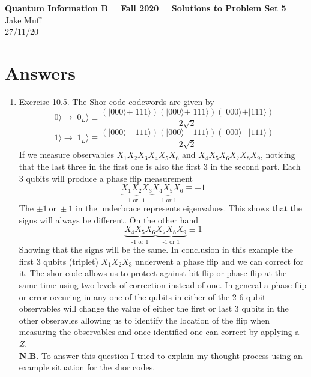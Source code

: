 \documentclass[12pt]{article}
\newcommand{\ket}[1]{\vert{#1}\rangle}
\begin{document}
\normalsize

\baselineskip 14pt

\begin{center}
{\Large {\bf Quantum Information B \ \ Fall 2020 \ \  Solutions to Problem Set 5}} \\
Jake Muff \\
27/11/20
\end{center}

\bigskip
\section{Answers}

\begin{enumerate}
    \item Exercise 10.5. The Shor code codewords are given by 
    $$ \ket{0} \rightarrow \ket{0_L} \equiv \frac{(\ket{000} + \ket{111}) (\ket{000}+\ket{111} )( \ket{000} +\ket{111} )}{2 \sqrt{2} } $$
    $$ \ket{1} \rightarrow \ket{1_L} \equiv \frac{(\ket{000} - \ket{111}) (\ket{000}- \ket{111} )( \ket{000} - \ket{111} )}{2 \sqrt{2} } $$
    If we measure observables $X_1 X_2 X_3 X_4 X_5 X_6$ and $X_4 X_5 X_6 X_7 X_8 X_9$, noticing that the last three in the first one is also the first 3 in the second part. Each 3 qubits will produce a phase flip measurement 
    $$ \underbrace{X_1 X_2 X_3 }_{\text{1 or -1}} \underbrace{X_4 X_5 X_6 }_{\text{-1 or 1}} \equiv -1 $$
    The $\pm 1 \ \text{or}\ \pm 1$ in the underbrace represents eigenvalues. This shows that the signs will always be different. On the other hand 
    $$ \underbrace{X_4 X_5 X_6 }_{\text{-1 or 1}} \underbrace{X_7 X_8 X_9 }_{\text{-1 or 1}} \equiv 1 $$
    Showing that the signs will be the same. In conclusion in this example the first 3 qubits (triplet) $X_1 X_2 X_3$ underwent a phase flip and we can correct for it. The shor code allows us to protect against bit flip or phase flip at the same time using two levels of correction instead of one. 
    In general a phase flip or error occuring in any one of the qubits in either of the 2 6 qubit observables will change the value of either the first or last 3 qubits in the other obseravles allowing us to identify the location of the flip when measuring the observables and once identified one can correct by applying a $Z$. 
    \\
    \textbf{N.B}. To answer this question I tried to explain my thought process using an example situation for the shor codes.  



\end{enumerate}
\end{document}
